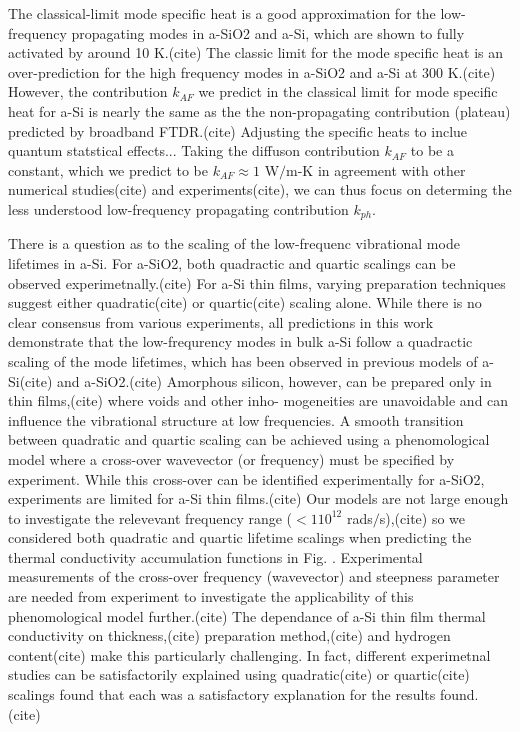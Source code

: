 \documentclass[aps,prb,twocolumn,superscriptaddress,footinbib,amsmath,amssymb,floatfix]{revtex4}
\begin{document}
{{The classical-limit mode specific heat is a good approximation 
for the low-frequency propagating modes in a-SiO2 and a-Si, which are shown to 
fully activated by around 10 K.(cite) 
The classic limit for the mode specific heat is 
an over-prediction for the high frequency modes in a-SiO2 and a-Si at 300 K.(cite) 
However, the contribution $k_{AF}$ we predict in the classical limit 
for mode specific heat for a-Si is nearly the same as the 
the non-propagating contribution (plateau) predicted by broadband FTDR.(cite) 
Adjusting the specific heats to inclue quantum statstical effects...
Taking the diffuson contribution $k_{AF}$ to be a constant, which we predict 
to be $k_{AF} \approx 1$ W$/$m-K in agreement with other numerical 
studies(cite) and experiments(cite), 
we can thus focus on determing the less understood 
low-frequency propagating 
contribution $k_{ph}$. 

There is a question as to the scaling of the low-frequenc vibrational mode lifetimes 
in a-Si. For a-SiO2, both quadractic and quartic scalings can be observed 
experimetnally.(cite) For a-Si thin films, varying preparation techniques suggest either 
quadratic(cite) or quartic(cite) scaling alone. 
While there is no clear consensus from various experiments, all predictions in this 
work demonstrate that  
the low-frequrency modes in bulk a-Si follow a quadractic scaling 
of the mode lifetimes, which has been observed in previous models of 
a-Si(cite) and 
a-SiO2.(cite)
Amorphous silicon, however, can be
prepared only in thin films,(cite) where voids and other inho-
mogeneities are unavoidable\cite{li_effect_2011} and can influence the 
vibrational structure at low frequencies.
\cite{feldman_tight-binding_2004,liu_high_2009} 
A smooth transition between quadratic and quartic scaling can be 
achieved using a phenomological model where a cross-over wavevector 
(or frequency) must be specified by experiment.
\cite{baldi_elastic_2011} While this cross-over can be identified 
experimentally for a-SiO2,\cite{masciovecchio_evidence_2006} 
experiments are limited for a-Si thin films.(cite) Our models 
are not large enough to investigate the relevevant frequency range 
($< 1 10^{12}$ rads$/$s),(cite) so we considered both 
quadratic and quartic lifetime scalings when predicting 
the thermal conductivity accumulation functions in Fig. . 
Experimental measurements of the cross-over frequency (wavevector) and 
steepness parameter are needed from experiment to investigate the 
applicability of this phenomological model further.(cite) The dependance 
of a-Si thin film thermal conductivity on thickness,(cite) 
preparation method,(cite) 
and hydrogen content(cite) make this particularly challenging. In fact, 
different experimetnal studies can be satisfactorily explained using 
quadratic(cite) or quartic(cite) scalings 
found that each was a satisfactory explanation for the results found.
(cite) 

}}
\end{document}
